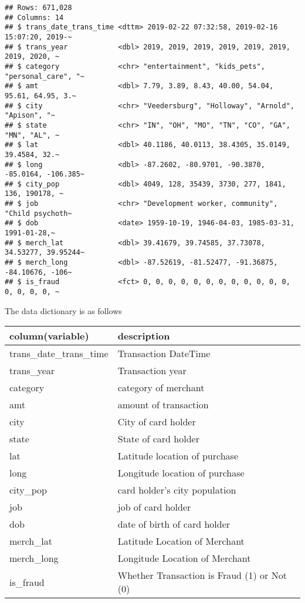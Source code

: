 \documentclass[
]{article}
\begin{document}
\begin{verbatim}
## Rows: 671,028
## Columns: 14
## $ trans_date_trans_time <dttm> 2019-02-22 07:32:58, 2019-02-16 15:07:20, 2019-~
## $ trans_year            <dbl> 2019, 2019, 2019, 2019, 2019, 2019, 2019, 2020, ~
## $ category              <chr> "entertainment", "kids_pets", "personal_care", "~
## $ amt                   <dbl> 7.79, 3.89, 8.43, 40.00, 54.04, 95.61, 64.95, 3.~
## $ city                  <chr> "Veedersburg", "Holloway", "Arnold", "Apison", "~
## $ state                 <chr> "IN", "OH", "MO", "TN", "CO", "GA", "MN", "AL", ~
## $ lat                   <dbl> 40.1186, 40.0113, 38.4305, 35.0149, 39.4584, 32.~
## $ long                  <dbl> -87.2602, -80.9701, -90.3870, -85.0164, -106.385~
## $ city_pop              <dbl> 4049, 128, 35439, 3730, 277, 1841, 136, 190178, ~
## $ job                   <chr> "Development worker, community", "Child psychoth~
## $ dob                   <date> 1959-10-19, 1946-04-03, 1985-03-31, 1991-01-28,~
## $ merch_lat             <dbl> 39.41679, 39.74585, 37.73078, 34.53277, 39.95244~
## $ merch_long            <dbl> -87.52619, -81.52477, -91.36875, -84.10676, -106~
## $ is_fraud              <fct> 0, 0, 0, 0, 0, 0, 0, 0, 0, 0, 0, 0, 0, 0, 0, 0, ~
\end{verbatim}

The data dictionary is as follows

\begin{longtable}[]{@{}ll@{}}
\toprule()
column(variable) & description \\
\midrule()
\endhead
trans\_date\_trans\_time & Transaction DateTime \\
trans\_year & Transaction year \\
category & category of merchant \\
amt & amount of transaction \\
city & City of card holder \\
state & State of card holder \\
lat & Latitude location of purchase \\
long & Longitude location of purchase \\
city\_pop & card holder's city population \\
job & job of card holder \\
dob & date of birth of card holder \\
merch\_lat & Latitude Location of Merchant \\
merch\_long & Longitude Location of Merchant \\
is\_fraud & Whether Transaction is Fraud (1) or Not (0) \\
\bottomrule()
\end{longtable}
\end{document}
